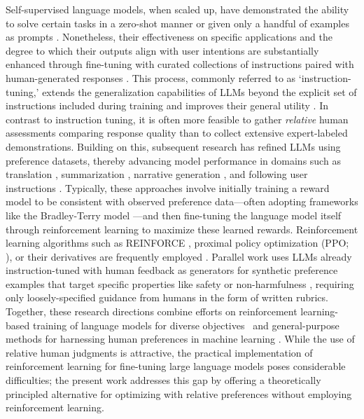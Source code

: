 Self-supervised language models, when scaled up, have demonstrated the ability to solve certain tasks in a zero-shot manner \citep{radford2019language} or given only a handful of examples as prompts \citep{gpt3,megatron,chowdhery2022palm}. Nonetheless, their effectiveness on specific applications and the degree to which their outputs align with user intentions are substantially enhanced through fine-tuning with curated collections of instructions paired with human-generated responses \citep{mishra-etal-2022-cross,sanh2022multitask,chung2022scaling,thoppilan2022lamda}. This process, commonly referred to as `instruction-tuning,' extends the generalization capabilities of LLMs beyond the explicit set of instructions included during training and improves their general utility \citep{chung2022scaling}. In contrast to instruction tuning, it is often more feasible to gather \textit{relative} human assessments comparing response quality than to collect extensive expert-labeled demonstrations. Building on this, subsequent research has refined LLMs using preference datasets, thereby advancing model performance in domains such as translation \citep{kreutzer-etal-2018-reliability}, summarization \citep{stiennon2022learning,ziegler2020finetuning}, narrative generation \citep{ziegler2020finetuning}, and following user instructions \citep{ouyang2022training,ramamurthy2023is}. Typically, these approaches involve initially training a reward model to be consistent with observed preference data—often adopting frameworks like the Bradley-Terry model \citep{bradley1952rankanalysis}—and then fine-tuning the language model itself through reinforcement learning to maximize these learned rewards. Reinforcement learning algorithms such as REINFORCE \citep{williams1992reinforce}, proximal policy optimization (PPO; \cite{schulman2017proximal}), or their derivatives are frequently employed \citep{ramamurthy2023is}. Parallel work uses LLMs already instruction-tuned with human feedback as generators for synthetic preference examples that target specific properties like safety or non-harmfulness \citep{bai2022constitutional}, requiring only loosely-specified guidance from humans in the form of written rubrics. Together, these research directions combine efforts on reinforcement learning-based training of language models for diverse objectives~\citep{Ranzato2015SequenceLT,paulus2018a,wu2018learning} and general-purpose methods for harnessing human preferences in machine learning \citep{christiano2017deep,kupcsik2018learning}. While the use of relative human judgments is attractive, the practical implementation of reinforcement learning for fine-tuning large language models poses considerable difficulties; the present work addresses this gap by offering a theoretically principled alternative for optimizing with relative preferences without employing reinforcement learning.

